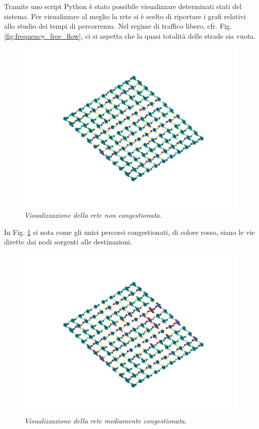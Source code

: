 \documentclass[../main.tex]{subfiles}
\begin{document}
Tramite uno script Python \`e stato possibile visualizzare determinati stati del sistema.
Per visualizzare al meglio la rete si \`e scelto di riportare i grafi relativi allo studio dei tempi di percorrenza.
Nel regime di traffico libero, cfr. Fig. \ref{fig:frequency_free_flow}, ci si aspetta che la quasi totalit\`a delle strade sia vuota.
\begin{figure}
    \includegraphics[scale=0.25, trim={2cm 5cm 10cm 5cm},clip]{./data/img/free_flow.png}
    \caption[Visualizzazione della rete non congestionata.]{\emph{Visualizzazione della rete non congestionata.}}
    \label{fig:visual_free}
\end{figure}
In Fig. \ref{fig:visual_free} si nota come gli unici percorsi congestionati, di colore rosso, siano le vie dirette dai nodi sorgenti alle destinazioni.
\begin{figure}
    \includegraphics[scale=0.25, trim={2cm 5cm 10cm 5cm},clip]{./data/img/flow.png}
    \caption[Visualizzazione della rete mediamente congestionata.]{\emph{Visualizzazione della rete mediamente congestionata.}}
    \label{fig:visual_medium}
\end{figure}
\end{document}
